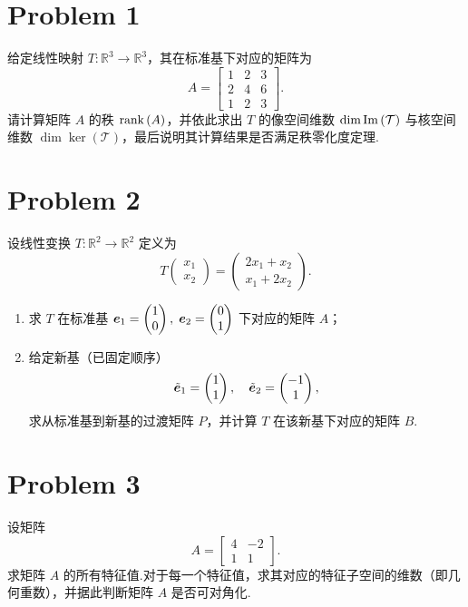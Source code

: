 \section*{Problem 1}

给定线性映射 $T : \mathbb{R}^3 \to \mathbb{R}^3$，其在标准基下对应的矩阵为
\[
A =
\begin{bmatrix}
1 & 2 & 3 \\
2 & 4 & 6 \\
1 & 2 & 3
\end{bmatrix}.
\]
请计算矩阵 $A$ 的秩 $\mathrm{rank} \left(A\right)$，并依此求出 $T$ 的像空间维数 $\dim \mathrm{Im} \left(\mathcal{T}\right)$ 与核空间维数 $\dim \ker\left(\mathcal{T}\right)$，最后说明其计算结果是否满足秩零化度定理.

\section*{Problem 2}

设线性变换 $T : \mathbb{R}^2 \to \mathbb{R}^2$ 定义为
\[
T\begin{pmatrix} x_1 \\ x_2 \end{pmatrix}
=
\begin{pmatrix}
2x_1 + x_2 \\
x_1 + 2x_2
\end{pmatrix}.
\]
\begin{enumerate}
\item 求 $T$ 在标准基 $\boldsymbol{e}_1 = \begin{pmatrix}1\\0\end{pmatrix},\;
\boldsymbol{e}_2 = \begin{pmatrix}0\\1\end{pmatrix}$ 下对应的矩阵 $A$；
\item 给定新基（已固定顺序）
\[
\tilde{\boldsymbol{e}}_1 = \begin{pmatrix}1\\1\end{pmatrix}, \quad
\tilde{\boldsymbol{e}}_2 = \begin{pmatrix}-1\\1\end{pmatrix},
\]
求从标准基到新基的过渡矩阵 $P$，并计算 $T$ 在该新基下对应的矩阵 $B$.
\end{enumerate}

\section*{Problem 3}

设矩阵
\[
A =
\begin{bmatrix}
4 & -2 \\
1 & 1
\end{bmatrix}.
\]
求矩阵 $A$ 的所有特征值.对于每一个特征值，求其对应的特征子空间的维数（即几何重数），并据此判断矩阵 $A$ 是否可对角化.
